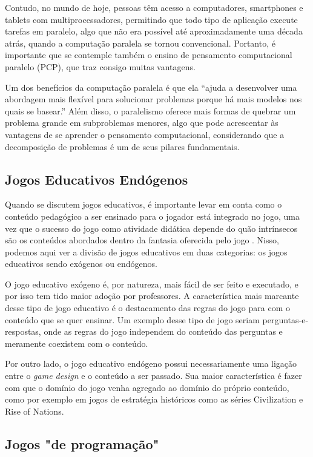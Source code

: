 \documentclass[conference]{IEEEtran}
\begin{document}
Contudo, no mundo de hoje, pessoas têm acesso a computadores, smartphones e tablets com multiprocessadores, permitindo que todo tipo de aplicação execute tarefas em paralelo, algo que não era possível até aproximadamente uma década atrás, quando a computação paralela se tornou convencional.  Portanto, é importante que se contemple também o ensino de pensamento computacional paralelo (PCP),  que traz consigo muitas vantagens\cite{b5}.

Um dos benefícios da computação paralela é que ela ``ajuda a desenvolver uma abordagem mais flexível para solucionar problemas porque há mais modelos nos quais se basear.''\cite{b5} Além disso, o paralelismo oferece mais formas de quebrar um problema grande em subproblemas menores, algo que pode acrescentar às vantagens de se aprender o pensamento computacional, considerando que a decomposição de problemas é um de seus pilares fundamentais\cite{b5}.

\subsection{Jogos Educativos Endógenos}

Quando se discutem jogos educativos, é importante levar em conta como o conteúdo pedagógico a ser ensinado para o jogador está integrado no jogo, uma vez que o sucesso do jogo como atividade didática depende do quão intrínsecos são os conteúdos abordados dentro da fantasia oferecida pelo jogo \cite{b13}. Nisso, podemos aqui ver a divisão de jogos educativos em duas categorias: os jogos educativos sendo exógenos ou endógenos\cite{b14}.

O jogo educativo exógeno é, por natureza, mais fácil de ser feito e executado, e por isso tem tido maior adoção por professores.\cite{b14} A característica mais marcante desse tipo de jogo educativo é o destacamento das regras do jogo para com o conteúdo que se quer ensinar.  Um exemplo desse tipo de jogo seriam perguntas-e-respostas, onde as regras do jogo independem do conteúdo das perguntas e meramente coexistem com o conteúdo.

Por outro lado, o jogo educativo endógeno possui necessariamente uma ligação entre o \textit{game design} e o conteúdo a ser passado. Sua maior característica é fazer com que o domínio do jogo venha agregado ao domínio do próprio conteúdo, como por exemplo em jogos de estratégia históricos como as séries Civilization e Rise of Nations\cite{b14}.

\subsection{Jogos "de programação"}
\end{document}
